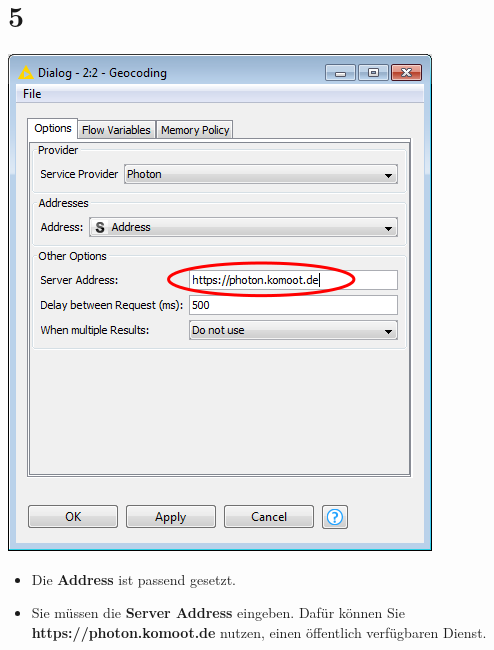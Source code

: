 \documentclass[10pt]{beamer}
\begin{document}
\section{5}
\begin{frame}
	\begin{center}
  		\includegraphics[height=0.6\textheight]{5.png}
	\end{center}
	\begin{itemize}
        \item Die \textbf{Address} ist passend gesetzt.
		\item Sie müssen die \textbf{Server Address} eingeben. Dafür können Sie \textbf{https://photon.komoot.de} nutzen, einen öffentlich verfügbaren Dienst. 
	\end{itemize}
\end{frame}
\end{document}
